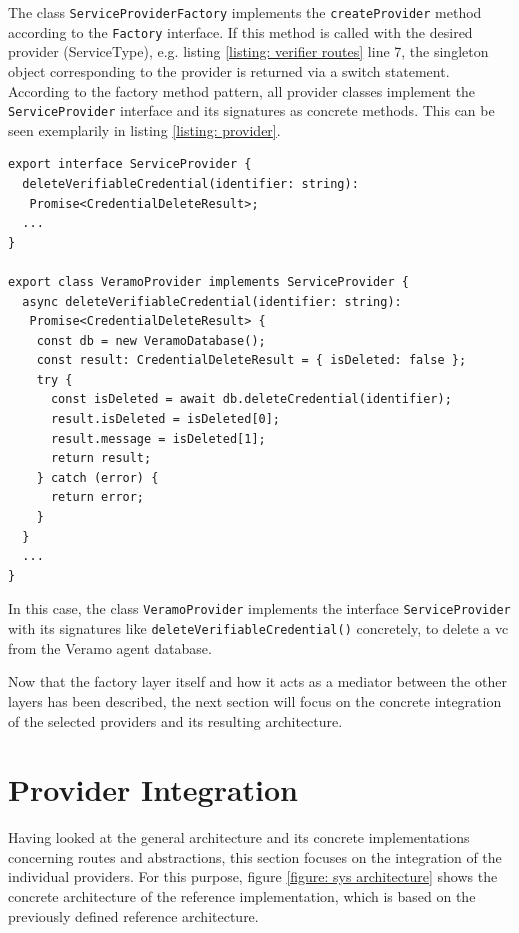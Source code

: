     The class \texttt{ServiceProviderFactory} implements the \texttt{createProvider} method according to the \texttt{Factory} interface. If this method is called with the desired provider (ServiceType), e.g. listing \ref{listing: verifier routes} line 7, the singleton object corresponding to the provider is returned via a switch statement. According to the factory method pattern, all provider classes implement the \texttt{ServiceProvider} interface and its signatures as concrete methods. This can be seen exemplarily in listing \ref{listing: provider}.
    \newline

\begin{lstlisting}[style=ES6, caption=Example of provider implementation, label={listing: provider}]
export interface ServiceProvider {
  deleteVerifiableCredential(identifier: string): 
   Promise<CredentialDeleteResult>;
  ...
}

export class VeramoProvider implements ServiceProvider {
  async deleteVerifiableCredential(identifier: string): 
   Promise<CredentialDeleteResult> {
    const db = new VeramoDatabase();
    const result: CredentialDeleteResult = { isDeleted: false };
    try {
      const isDeleted = await db.deleteCredential(identifier);
      result.isDeleted = isDeleted[0];
      result.message = isDeleted[1];
      return result;
    } catch (error) {
      return error;
    }
  }
  ...
}\end{lstlisting}

    In this case, the class \texttt{VeramoProvider} implements the interface \texttt{ServiceProvider} with its signatures like \texttt{deleteVerifiableCredential()} concretely, to delete a \ac{vc} from the Veramo agent database.
    
    Now that the factory layer itself and how it acts as a mediator between the other layers has been described, the next section will focus on the concrete integration of the selected providers and its resulting architecture.
    
        
    \section{Provider Integration}
    
    Having looked at the general architecture and its concrete implementations concerning routes and abstractions, this section focuses on the integration of the individual providers. For this purpose, figure \ref{figure: sys architecture} shows the concrete architecture of the reference implementation, which is based on the previously defined reference architecture. 
    
